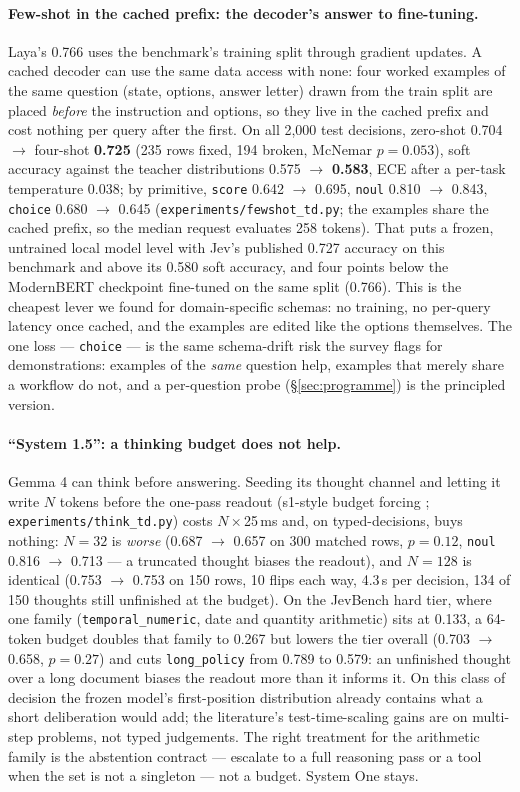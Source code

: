 \documentclass[11pt,a4paper]{article}
\newcommand{\code}[1]{\texttt{#1}}
\begin{document}
\paragraph{Few-shot in the cached prefix: the decoder's answer to fine-tuning.} Laya's 0.766 uses the benchmark's training split through gradient updates. A cached decoder can use the same data access with none: four worked examples of the same question (state, options, answer letter) drawn from the train split are placed \emph{before} the instruction and options, so they live in the cached prefix and cost nothing per query after the first. On all 2,000 test decisions, zero-shot 0.704 $\to$ four-shot \textbf{0.725} (235 rows fixed, 194 broken, McNemar $p=0.053$), soft accuracy against the teacher distributions 0.575 $\to$ \textbf{0.583}, ECE after a per-task temperature 0.038; by primitive, \code{score} 0.642 $\to$ 0.695, \code{noul} 0.810 $\to$ 0.843, \code{choice} 0.680 $\to$ 0.645 (\code{experiments/fewshot\_td.py}; the examples share the cached prefix, so the median request evaluates 258 tokens). That puts a frozen, untrained local model level with Jev's published 0.727 accuracy on this benchmark and above its 0.580 soft accuracy, and four points below the ModernBERT checkpoint fine-tuned on the same split (0.766). This is the cheapest lever we found for domain-specific schemas: no training, no per-query latency once cached, and the examples are edited like the options themselves. The one loss --- \code{choice} --- is the same schema-drift risk the survey flags for demonstrations: examples of the \emph{same} question help, examples that merely share a workflow do not, and a per-question probe (\S\ref{sec:programme}) is the principled version.

\paragraph{``System 1.5'': a thinking budget does not help.} Gemma 4 can think before answering. Seeding its thought channel and letting it write $N$ tokens before the one-pass readout (s1-style budget forcing \cite{s1}; \code{experiments/think\_td.py}) costs $N\times$25\,ms and, on typed-decisions, buys nothing: $N=32$ is \emph{worse} (0.687 $\to$ 0.657 on 300 matched rows, $p=0.12$, \code{noul} 0.816 $\to$ 0.713 --- a truncated thought biases the readout), and $N=128$ is identical (0.753 $\to$ 0.753 on 150 rows, 10 flips each way, 4.3\,s per decision, 134 of 150 thoughts still unfinished at the budget). On the JevBench hard tier, where one family (\code{temporal\_numeric}, date and quantity arithmetic) sits at 0.133, a 64-token budget doubles that family to 0.267 but lowers the tier overall (0.703 $\to$ 0.658, $p=0.27$) and cuts \code{long\_policy} from 0.789 to 0.579: an unfinished thought over a long document biases the readout more than it informs it. On this class of decision the frozen model's first-position distribution already contains what a short deliberation would add; the literature's test-time-scaling gains are on multi-step problems, not typed judgements. The right treatment for the arithmetic family is the abstention contract --- escalate to a full reasoning pass or a tool when the set is not a singleton --- not a budget. System One stays.
\end{document}

